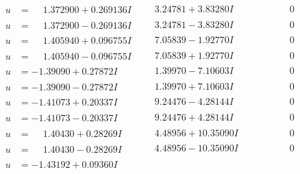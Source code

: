 \documentclass[1p]{elsarticle_modified}
\theoremstyle{definition}
\begin{document}
$$\begin{array}{c|c|c}
 \hline 
\begin{aligned}
u &= \phantom{-}1.372900 + 0.269136 I\end{aligned}
 & \phantom{-}3.24781 + 3.83280 I & \phantom{-0.000000 } 0 \\ \hline\begin{aligned}
u &= \phantom{-}1.372900 - 0.269136 I\end{aligned}
 & \phantom{-}3.24781 - 3.83280 I & \phantom{-0.000000 } 0 \\ \hline\begin{aligned}
u &= \phantom{-}1.405940 + 0.096755 I\end{aligned}
 & \phantom{-}7.05839 - 1.92770 I & \phantom{-0.000000 } 0 \\ \hline\begin{aligned}
u &= \phantom{-}1.405940 - 0.096755 I\end{aligned}
 & \phantom{-}7.05839 + 1.92770 I & \phantom{-0.000000 } 0 \\ \hline\begin{aligned}
u &= -1.39090 + 0.27872 I\end{aligned}
 & \phantom{-}1.39970 - 7.10603 I & \phantom{-0.000000 } 0 \\ \hline\begin{aligned}
u &= -1.39090 - 0.27872 I\end{aligned}
 & \phantom{-}1.39970 + 7.10603 I & \phantom{-0.000000 } 0 \\ \hline\begin{aligned}
u &= -1.41073 + 0.20337 I\end{aligned}
 & \phantom{-}9.24476 - 4.28144 I & \phantom{-0.000000 } 0 \\ \hline\begin{aligned}
u &= -1.41073 - 0.20337 I\end{aligned}
 & \phantom{-}9.24476 + 4.28144 I & \phantom{-0.000000 } 0 \\ \hline\begin{aligned}
u &= \phantom{-}1.40430 + 0.28269 I\end{aligned}
 & \phantom{-}4.48956 + 10.35090 I & \phantom{-0.000000 } 0 \\ \hline\begin{aligned}
u &= \phantom{-}1.40430 - 0.28269 I\end{aligned}
 & \phantom{-}4.48956 - 10.35090 I & \phantom{-0.000000 } 0 \\ \hline\begin{aligned}
u &= -1.43192 + 0.09360 I\end{aligned}

\end{array}$$
\end{document}
